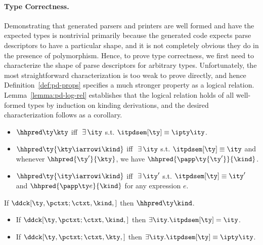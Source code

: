 \paragraph*{Type Correctness.}
Demonstrating that generated parsers and printers are well formed
and have the expected types is nontrivial primarily because
the generated code expects parse descriptors to have a particular shape,
and it is not completely obvious they do in the presence of polymorphism.
Hence, to prove type correctness, we first need to characterize the shape of
parse descriptors for arbitrary \ddc{} types.   
Unfortunately, the most straightforward characterization is
too weak to prove directly, and hence Definition~\ref{def:pd-props}
specifies a much stronger property as a logical relation.
Lemma~\ref{lemma:pd-log-rel} establishes that the logical relation
holds of all well-formed \ddc{} types by induction on kinding
derivations, and the desired characterization follows as a corollary.

\begin{definition}
\label{def:pd-props}
\begin{itemize}
\item $\hhpred \ty \kty$ iff $\ \exists\,\ity$ s.t. $\itpdsem[\ty] \equiv
  {\ipty \ity}$.
\item $\hhpred \ty {\kty \iarrowi \kind}$ iff $\ \exists\,\ity$
  s.t. $\itpdsem[\ty] \equiv \ity$ and whenever $\hhpred
  {\ty'}{\kty}$, we have $\hhpred {\papp \ty {\ty'}}{\kind}$.
\item $\hhpred \ty {\ity \iarrowi \kind}$ iff $\ \exists\,\ity'$
  s.t. $\itpdsem[\ty] \equiv \ity'$ and $\hhpred{\papp \ty e}{\kind}$
  for any expression $e$.
\end{itemize}
\end{definition}
\begin{lemma}
\label{lemma:pd-log-rel}
If $\ddck[\ty,{\pctxt;\ctxt},\kind,{}]$ then $\hhpred \ty \kind$.
\end{lemma}

\begin{lemma}
\label{lemma:pd-props}
  \begin{itemize}
  \item If $\ddck[\ty,\pctxt;\ctxt,\kind,{}]$ then $\exists
     \ity.\itpdsem[\ty] = \ity$.
   \item If $\ddck[\ty,\pctxt;\ctxt,\kty,{}]$ then $\exists
     \ity.\itpdsem[\ty] \equiv \ipty \ity$.
  \end{itemize}
\end{lemma}


